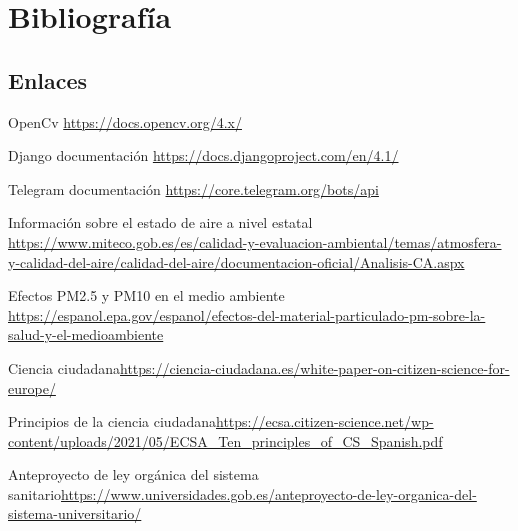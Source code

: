 \chapter{Bibliografía}\label{int}
\section{Enlaces}
\begin{enumerate}[label={[\arabic*]}]
    \item {OpenCv }\url{https://docs.opencv.org/4.x/}
    \item {Django documentación }\url{https://docs.djangoproject.com/en/4.1/}
  \item {Telegram documentación }\url{https://core.telegram.org/bots/api}
    \item {Información sobre el estado de aire a nivel estatal }\url{https://www.miteco.gob.es/es/calidad-y-evaluacion-ambiental/temas/atmosfera-y-calidad-del-aire/calidad-del-aire/documentacion-oficial/Analisis-CA.aspx}

    \item {Efectos PM2.5 y PM10 en el medio ambiente} \url{https://espanol.epa.gov/espanol/efectos-del-material-particulado-pm-sobre-la-salud-y-el-medioambiente}
    \item{Ciencia ciudadana}\url{https://ciencia-ciudadana.es/white-paper-on-citizen-science-for-europe/}
    \item{Principios de la ciencia ciudadana}\url{https://ecsa.citizen-science.net/wp-content/uploads/2021/05/ECSA_Ten_principles_of_CS_Spanish.pdf}
    \item{Anteproyecto de ley orgánica del sistema sanitario}\url{https://www.universidades.gob.es/anteproyecto-de-ley-organica-del-sistema-universitario/}
\end{enumerate}
